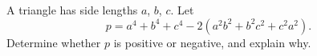 A triangle has side lengths $a$, $b$, $c$. Let
\[
p=a^4+b^4+c^4-2\left(a^2b^2+b^2c^2+c^2a^2\right).
\]
Determine whether $p$ is positive or negative, and explain why.
